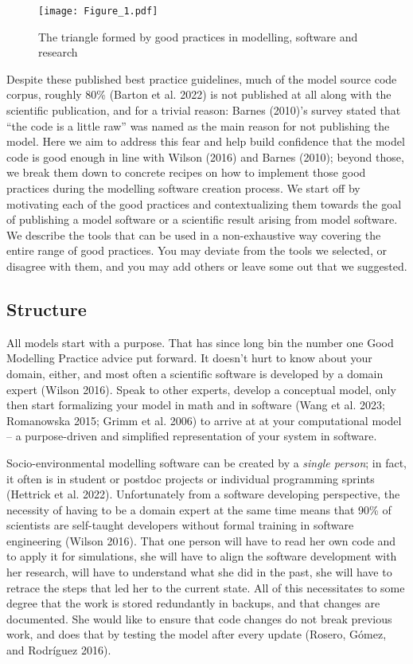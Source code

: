 \documentclass[preprint,11pt,5p]{elsarticle}
\begin{document}
\label{fig:triangle}
\begin{figure}
\centering
\texttt{[image: Figure\_1.pdf]}
\caption{The triangle formed by good practices in modelling, software
and research \label{fig:triangle}}
\end{figure}

Despite these published best practice guidelines, much of the model
source code corpus, roughly 80\% (Barton et al. 2022) is not published
at all along with the scientific publication, and for a trivial reason:
Barnes (2010)'s survey stated that ``the code is a little raw'' was
named as the main reason for not publishing the model. Here we aim to
address this fear and help build confidence that the model code is good
enough in line with Wilson (2016) and Barnes (2010); beyond those, we
break them down to concrete recipes on how to implement those good
practices during the modelling software creation process. We start off
by motivating each of the good practices and contextualizing them
towards the goal of publishing a model software or a scientific result
arising from model software. We describe the tools that can be used in a
non-exhaustive way covering the entire range of good practices. You may
deviate from the tools we selected, or disagree with them, and you may
add others or leave some out that we suggested.

\subsection{Structure}\label{structure}

All models start with a purpose. That has since long bin the number one
Good Modelling Practice advice put forward. It doesn't hurt to know
about your domain, either, and most often a scientific software is
developed by a domain expert (Wilson 2016). Speak to other experts,
develop a conceptual model, only then start formalizing your model in
math and in software (Wang et al. 2023; Romanowska 2015; Grimm et al.
2006) to arrive at at your computational model -- a purpose-driven and
simplified representation of your system in software.

Socio-environmental modelling software can be created by a \emph{single
person}; in fact, it often is in student or postdoc projects or
individual programming sprints (Hettrick et al. 2022). Unfortunately
from a software developing perspective, the necessity of having to be a
domain expert at the same time means that 90\% of scientists are
self-taught developers without formal training in software engineering
(Wilson 2016). That one person will have to read her own code and to
apply it for simulations, she will have to align the software
development with her research, will have to understand what she did in
the past, she will have to retrace the steps that led her to the current
state. All of this necessitates to some degree that the work is stored
redundantly in backups, and that changes are documented. She would like
to ensure that code changes do not break previous work, and does that by
testing the model after every update (Rosero, Gómez, and Rodríguez
2016).
\end{document}
